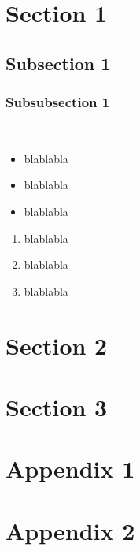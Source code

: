 \documentclass[11pt]{article}
\begin{document}
\maketitle
\tableofcontents

\section{Section 1}

\subsection{Subsection 1}

\subsubsection{Subsubsection 1}

\begin{equation*}
\end{equation*}

\begin{align*}
\end{align*}

\begin{itemize}
	\item blablabla
	\item blablabla
	\item blablabla
\end{itemize}

\begin{enumerate}
	\item blablabla
	\item blablabla
	\item blablabla
\end{enumerate}

\begin{figure}[ht!]
	\centering
	\caption{}
\end{figure}

\section{Section 2}

\section{Section 3}

\appendix

\begin{appendices}

\section{Appendix 1}

\section{Appendix 2}

\end{appendices}
\end{document}
